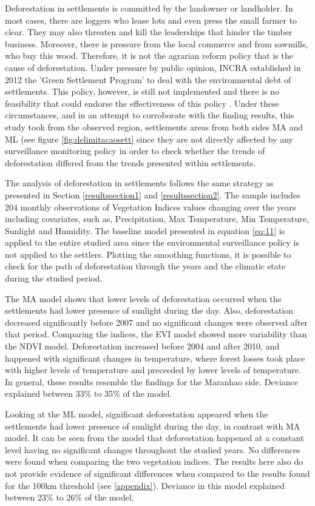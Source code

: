Deforestation in settlements is committed by the landowner or landholder. In most cases, there are loggers who lease lots and even press the small farmer to clear. They may also threaten and kill the leaderships that hinder the timber business. Moreover, there is pressure from the local commerce and from sawmills, who buy this wood. Therefore, it is not the agrarian reform policy that is the cause of deforestation. Under pressure by public opinion, INCRA established in 2012 the 'Green Settlement Program' to deal with the environmental debt of settlements. This policy, however, is still not implemented and there is no feasibility that could endorse the effectiveness of this policy \citet{PACHECO,PERES2}. Under these circumstances, and in an attempt to corroborate with the finding results, this study took from the observed region, settlements areas from both sides MA and ML (see figure \ref{fig:delimitacaosett} since they are not directly affected by any surveillance monitoring policy in order to check whether the trends of deforestation differed from the trends presented within settlements.

The analysis of deforestation in settlements follows the same strategy as presented in Section \ref{resultssection1} and \ref{resultssection2}. The sample includes 204 monthly observations of Vegetation Indices values changing over the years including covariates, such as, Precipitation, Max Temperature, Min Temperature, Sunlight and Humidity. The baseline model presented in equation \ref{eq:11} is applied to the entire studied area since the environmental surveillance policy is not applied to the settlers. Plotting the smoothing functions, it is possible to check for the path of deforestation through the years and the  climatic  state  during  the studied period. 

The MA model shows that lower levels of deforestation occurred when the settlements had lower presence of sunlight during the day. Also, deforestation decreased significantly before 2007 and no significant changes were observed after that period. Comparing the indices, the EVI model showed more variability than the NDVI model. Deforestation increased before 2004 and after 2010, and happened with significant changes in temperature, where forest losses took place with higher levels of temperature and preceeded by lower levels of temperature. In general, these results resemble the findings for the Maranhao side. Deviance explained between 33$\%$ to 35$\%$ of the model.

Looking at the ML model, significant deforestation appeared when the settlements had lower presence of sunlight during the day, in contrast with MA model. It can be seen from the model that deforestation happened at a constant level having no significant changes throughout the studied years. No differences were found when comparing the two vegetation indices. The results here also do not provide evidence of significant differences when compared to the results found for the 100km threshold (see \ref{appendix}). Deviance in this model explained between 23$\%$ to 26$\%$ of the model.

